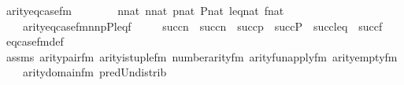 \begin{isabellebody}
\endisatagML
{\isafoldML}%
%
\isadelimML
\isanewline
%
\endisadelimML
\isanewline
{}\isamarkupfalse%
\ arity{\isacharunderscore}{\kern0pt}eq{\isacharunderscore}{\kern0pt}case{\isacharunderscore}{\kern0pt}fm\ {\isacharcolon}{\kern0pt}\isanewline
\ \ \isanewline
\ \ \ \ {\isachardoublequoteopen}n{}{\isasymin}nat{\isachardoublequoteclose}\ {\isachardoublequoteopen}n{}{\isasymin}nat{\isachardoublequoteclose}\ {\isachardoublequoteopen}p{\isasymin}nat{\isachardoublequoteclose}\ {\isachardoublequoteopen}P{\isasymin}nat{\isachardoublequoteclose}\ {\isachardoublequoteopen}leq{\isasymin}nat{\isachardoublequoteclose}\ {\isachardoublequoteopen}f{\isasymin}nat{\isachardoublequoteclose}\isanewline
\ \ \isanewline
\ \ \ \ {\isachardoublequoteopen}arity{\isacharparenleft}{\kern0pt}eq{\isacharunderscore}{\kern0pt}case{\isacharunderscore}{\kern0pt}fm{\isacharparenleft}{\kern0pt}n{}{\isacharcomma}{\kern0pt}n{}{\isacharcomma}{\kern0pt}p{\isacharcomma}{\kern0pt}P{\isacharcomma}{\kern0pt}leq{\isacharcomma}{\kern0pt}f{\isacharparenright}{\kern0pt}{\isacharparenright}{\kern0pt}\ {\isacharequal}{\kern0pt}\isanewline
\ \ \ \ succ{\isacharparenleft}{\kern0pt}n{}{\isacharparenright}{\kern0pt}\ {\isasymunion}\ succ{\isacharparenleft}{\kern0pt}n{}{\isacharparenright}{\kern0pt}\ {\isasymunion}\ succ{\isacharparenleft}{\kern0pt}p{\isacharparenright}{\kern0pt}\ {\isasymunion}\ succ{\isacharparenleft}{\kern0pt}P{\isacharparenright}{\kern0pt}\ {\isasymunion}\ succ{\isacharparenleft}{\kern0pt}leq{\isacharparenright}{\kern0pt}\ {\isasymunion}\ succ{\isacharparenleft}{\kern0pt}f{\isacharparenright}{\kern0pt}{\isachardoublequoteclose}\isanewline
%
\isadelimproof
\ \ %
\endisadelimproof
%
\isatagproof
{}\isamarkupfalse%
\ eq{\isacharunderscore}{\kern0pt}case{\isacharunderscore}{\kern0pt}fm{\isacharunderscore}{\kern0pt}def\isanewline
\ \ \isamarkupfalse%
\ assms\ arity{\isacharunderscore}{\kern0pt}pair{\isacharunderscore}{\kern0pt}fm\ arity{\isacharunderscore}{\kern0pt}is{\isacharunderscore}{\kern0pt}tuple{\isacharunderscore}{\kern0pt}fm\ number{}arity{\isacharunderscore}{\kern0pt}{\isacharunderscore}{\kern0pt}fm\ arity{\isacharunderscore}{\kern0pt}fun{\isacharunderscore}{\kern0pt}apply{\isacharunderscore}{\kern0pt}fm\ arity{\isacharunderscore}{\kern0pt}empty{\isacharunderscore}{\kern0pt}fm\isanewline
\ \ \ \ arity{\isacharunderscore}{\kern0pt}domain{\isacharunderscore}{\kern0pt}fm\ pred{\isacharunderscore}{\kern0pt}Un{\isacharunderscore}{\kern0pt}distrib\isanewline

\end{isabellebody}
